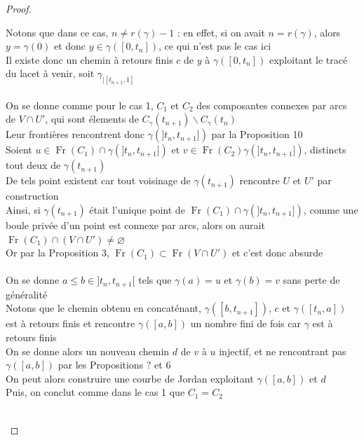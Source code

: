 \documentclass{article}
\begin{document}
\begin{flushleft}
\begin{proof}
\begin{itemize}
        Notons que dans ce cas, $n \neq r(\gamma)-1$ : en effet, si on avait $n = r(\gamma)$, alors $y = \gamma(0)$
        et donc $y \in \gamma([0, t_n])$, ce qui n'est pas le cas ici\\
        Il existe donc un chemin à retours finis $c$ de $y$ à $\gamma([0, t_n])$ exploitant le tracé du lacet à venir, soit
        $\gamma_{\mid [t_{n+1}, 1]}$
        \\~\\
        On se donne comme pour le cas 1, $C_1$ et $C_2$ des composantes connexes par arcs de $V \cap U'$,
        qui sont élements de $C_{\gamma}(t_{n+1})\backslash C_{\gamma}(t_n)$\\
        Leur frontières rencontrent donc $\gamma(]t_n, t_{n+1}])$ par la Proposition 10\\
        Soient $u \in \operatorname{Fr}(C_1) \cap \gamma(]t_n, t_{n+1}])$ et
        $v \in \operatorname{Fr}(C_2) \gamma(]t_n, t_{n+1}])$, distincts tout deux de $\gamma(t_{n+1})$\\
        De tels point existent car tout voisinage de $\gamma(t_{n+1})$ rencontre $U$ et $U'$ par construction\\
        Ainsi, si $\gamma(t_{n+1})$ était l'unique point de $\operatorname{Fr}(C_1) \cap \gamma(]t_n, t_{n+1}])$, comme une boule privée
        d'un point est connexe par arcs, alors on aurait $\operatorname{Fr}(C_1) \cap (V \cap U') \neq \varnothing$\\
        Or par la Proposition 3, $\operatorname{Fr}(C_1) \subset \operatorname{Fr}(V \cap U')$ et c'est donc absurde
        \\~\\ 
        On se donne $a \leq b \in ]t_n, t_{n+1}[$ tels que $\gamma(a) = u$ et $\gamma(b) = v$ sans perte de généralité\\
        Notons que le chemin obtenu en concaténant, $\gamma([b, t_{n+1}])$, $c$ et $\gamma([t_n, a])$ est à retours finis
        et rencontre $\gamma([a, b])$ un nombre fini de fois car $\gamma$ est à retours finis\\
        On se donne alors un nouveau chemin $d$ de $v$ à $u$ injectif, et ne rencontrant pas $\gamma([a, b])$ par les Propositions ? et 6\\
        On peut alors construire une courbe de Jordan exploitant $\gamma([a, b])$ et $d$\\
        Puis, on conclut comme dans le cas 1 que $C_1 = C_2$
        \\~\\

\end{itemize}
\end{proof}
\end{flushleft}
\end{document}
